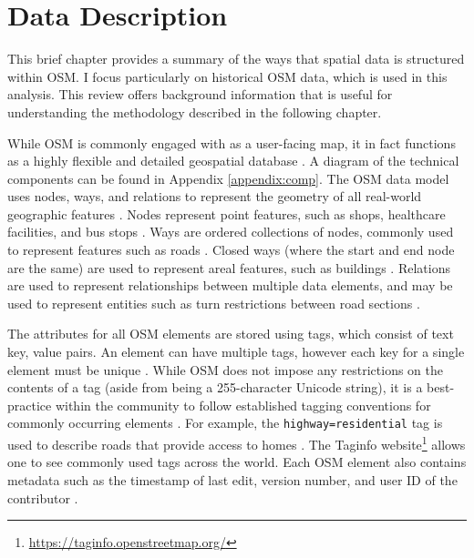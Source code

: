 \chapter{Data Description}
\label{chapterlabel3}
This brief chapter provides a summary of the ways that spatial data is structured within OSM. I focus particularly on historical OSM data, which is used in this analysis. This review offers background information that is useful for understanding the methodology described in the following chapter. 

While OSM is commonly engaged with as a user-facing map, it in fact functions as a highly flexible and detailed geospatial database \parencite{openstreetmap_wiki_component_2018}. A diagram of the technical components can be found in Appendix \ref{appendix:comp}. The OSM data model uses nodes, ways, and relations to represent the geometry of all real-world geographic features \parencite{openstreetmap_wiki_elements_2020}. Nodes represent point features, such as shops, healthcare facilities, and bus stops \parencite{openstreetmap_wiki_node_2019}. Ways are ordered collections of nodes, commonly used to represent features such as roads \parencite{openstreetmap_wiki_way_2020}. Closed ways (where the start and end node are the same) are used to represent areal features, such as buildings \parencite{openstreetmap_wiki_way_2020}. Relations are used to represent relationships between multiple data elements, and may be used to represent entities such as turn restrictions between road sections \parencite{openstreetmap_wiki_relation_2019}. 


The attributes for all OSM elements are stored using tags, which consist of text key, value pairs. An element can have multiple tags, however each key for a single element must be unique \parencite{openstreetmap_wiki_tags_2020}. While OSM does not impose any restrictions on the contents of a tag (aside from being a 255-character Unicode string), it is a best-practice within the community to follow established tagging conventions for commonly occurring elements \parencite{openstreetmap_wiki_tags_2020}. For example, the \texttt{highway=residential} tag is used to describe roads that provide access to homes \parencite{openstreetmap_wiki_elements_2020}. The Taginfo website\footnote{\url{https://taginfo.openstreetmap.org/}} allows one to see commonly used tags across the world. Each OSM element also contains metadata such as the timestamp of last edit, version number, and user ID of the contributor \parencite{openstreetmap_wiki_elements_2020}. 



